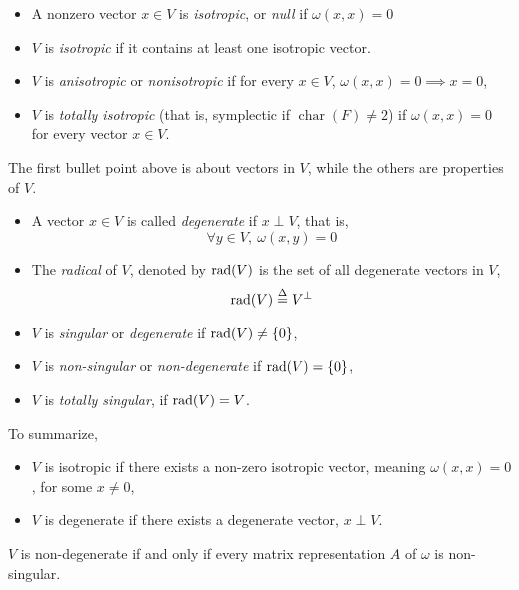 \documentclass[../main-manifolds.tex]{subfiles}
\begin{document}
    \begin{definition}
        \begin{itemize}
            \item A nonzero vector $x\in V$ is \emph{isotropic}, or \emph{null} if $\omega(x,x)=0$
            \item $V$ is \emph{isotropic} if it contains at least one isotropic vector.
            \item $V$ is \emph{anisotropic} or \emph{nonisotropic} if for every $x\in V$, $\omega(x,x)=0\implies x=0$,
            \item $V$ is \emph{totally isotropic} (that is, symplectic if $\operatorname{char}(F)\neq 2$) if $\omega(x,x)=0$ for every vector $x\in V$. 
        \end{itemize}
        
            The first bullet point above is about vectors in $V$, while the others are properties of $V$.
        \begin{itemize}
            \item A vector $x\in V$ is called \emph{degenerate} if $x\perp V$, that is, 
            \[
                \forall y\in V,\: \omega(x,y)=0
            \]
            \item The \emph{radical} of $V$, denoted by $\operatorname{rad}({V})$ is the set of all degenerate vectors in $V$,
            \[
                \operatorname{rad}({V})\overset{\Delta}{=} V^\perp  
            \]
            \item $V$ is \emph{singular} or \emph{degenerate} if $\operatorname{rad}({V})\neq \{0\}$,
            \item $V$ is \emph{non-singular} or \emph{non-degenerate} if $\operatorname{rad}({V}) = \{0\}$,
            \item $V$ is \emph{totally singular}, if $\operatorname{rad}({V}) = V$. 
        \end{itemize}
        To summarize,
        \begin{itemize}
            \item $V$ is isotropic if there exists a non-zero isotropic vector, meaning $\omega(x,x)=0$, for some $x\neq 0$,
            \item $V$ is degenerate if there exists a degenerate vector, $x\perp V$.
        \end{itemize}
    \end{definition}
    \begin{wts}
        $V$ is non-degenerate if and only if every matrix representation $A$ of $\omega$ is non-singular. 
    \end{wts}
\end{document}
